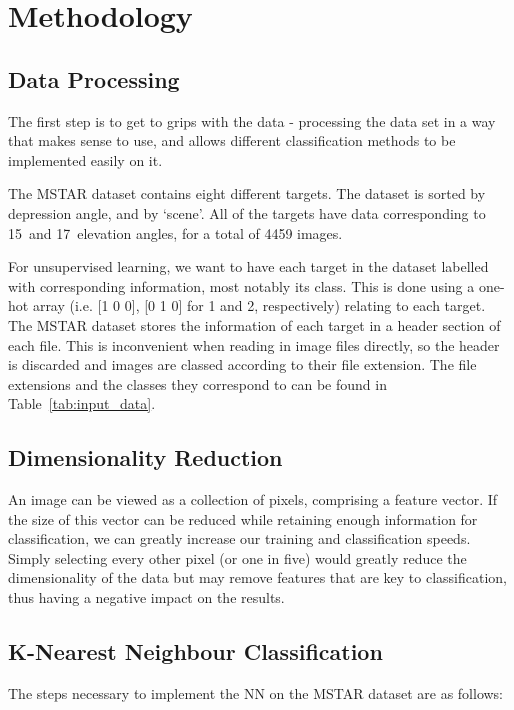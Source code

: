 \chapter{Methodology}\label{sec:method}

\section{Data Processing}
The first step is to get to grips with the data - processing the data set in a way that makes sense to use, and allows different classification methods to be implemented easily on it.

The MSTAR dataset contains eight different targets. The dataset is sorted by depression angle, and by `scene'. All of the targets have data corresponding to  15\degree~and 17\degree~elevation angles, for a total of 4459 images.

For unsupervised learning, we want to have each target in the dataset labelled with corresponding information, most notably its class. This is done using a one-hot array (i.e. [1 0 0], [0 1 0] for 1 and 2, respectively) relating to each target. The MSTAR dataset stores the information of each target in a header section of each file. This is inconvenient when reading in image files directly, so the header is discarded and images are classed according to their file extension. The file extensions and the classes they correspond to can be found in Table~\ref{tab:input_data}.


\section{Dimensionality Reduction}
An image can be viewed as a collection of pixels, comprising a feature vector. If the size of this vector can be reduced while retaining enough information for classification, we can greatly increase our training and classification speeds. Simply selecting every other pixel (or one in five) would greatly reduce the dimensionality of the data but may remove features that are key to classification, thus having a negative impact on the results.


\section{K-Nearest Neighbour Classification}
The steps necessary to implement the NN on the MSTAR dataset are as follows:\\

